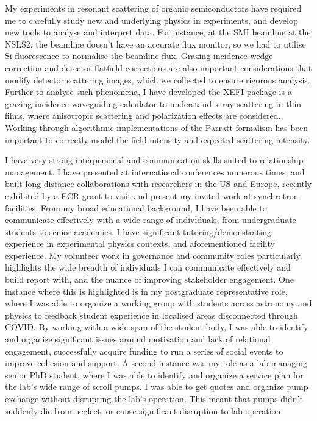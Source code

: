 \documentclass[10pt,a4paper,ragged2e,withhyper,paragraphstrue]{altacv}
\begin{document}
{    %
    My experiments in resonant scattering of organic semiconductors have required me to carefully study new and underlying physics in experiments, and develop new tools to analyse and interpret data. For instance, at the SMI beamline at the NSLS2, the beamline doesn't have an accurate flux monitor, so we had to utilise Si fluorescence to normalise the beamline flux. Grazing incidence wedge correction and detector flatfield corrections are also important considerations that modify detector scattering images, which we collected to ensure rigorous analysis. Further to analyse such phenomena, I have developed the XEFI package is a grazing-incidence waveguiding calculator to understand x-ray scattering in thin films, where anisotropic scattering and polarization effects are considered. Working through algorithmic implementations of the Parratt formalism has been important to correctly model the field intensity and expected scattering intensity.

    I have very strong interpersonal and communication skills suited to relationship management. I have presented at international conferences numerous times, and built long-distance collaborations with researchers in the US and Europe, recently exhibited by a ECR grant to visit and present my invited work at synchrotron facilities. From my broad educational background, I have been able to communicate effectively with a wide range of individuals, from undergraduate students to senior academics. I have significant tutoring/demonstrating experience in experimental physics contexts, and aforementioned facility experience. My volunteer work in governance and community roles particularly highlights the wide breadth of individuals I can communicate effectively and build report with, and the nuance of improving stakeholder engagement.
    One instance where this is highlighted is in my postgraduate representative role, where I was able to organize a working group with students across astronomy and physics to feedback student experience in localised areas disconnected through COVID. By working with a wide span of the student body, I was able to identify and organize significant issues around motivation and lack of relational engagement, successfully acquire funding to run a series of social events to improve cohesion and support.
    A second instance was my role as a lab managing senior PhD student, where I was able to identify and organize a service plan for the lab's wide range of scroll pumps. I was able to get quotes and organize pump exchange without disrupting the lab's operation. This meant that pumps didn't suddenly die from neglect, or cause significant disruption to lab operation.
    
}
\end{document}
